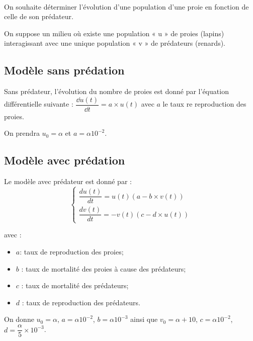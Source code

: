 \exer{[EQD-009]}
\setcounter{numques}{0}~\\

\begin{obj}
On souhaite déterminer l’évolution d’une population d’une proie en fonction de celle de son prédateur.
\end{obj}

On suppose un milieu où existe une population « u » de proies (lapins) interagissant avec une unique population « v » de prédateurs (renards).

\subsection*{Modèle sans prédation}

Sans prédateur, l'évolution du nombre de proies est donné par l'équation différentielle suivante : $\dfrac{\dd u(t)}{\dd t} = a \times u(t)$ avec $a$ le taux re reproduction des proies. 

On prendra  $u_0 = \alpha$ et $a=\alpha 10^{-2}$. 



\subsection*{Modèle avec prédation}
Le modèle avec prédateur est donné par : 
$$
\left\{
\begin{array}{l}
\dfrac{du(t)}{dt}=u(t)\left(a - b\times v(t)\right)\\
\dfrac{dv(t)}{dt}=-v(t)\left(c - d\times u(t)\right)
\end{array}
\right.
$$

avec :
\begin{itemize}
\item $a $: taux de reproduction des proies;
\item $b$ : taux de mortalité des proies à cause des prédateurs;
\item $c$ : taux de mortalité des prédateurs;
\item $d$ : taux de reproduction des prédateurs.
\end{itemize}

On donne $u_0=\alpha$, $a=\alpha 10^{-2}$, $b=\alpha 10^{-3}$ ainsi que 
$v_0=\alpha+10$, $c=\alpha 10^{-2}$, $d=\dfrac{\alpha}{5} \times  10^{-3}$.




